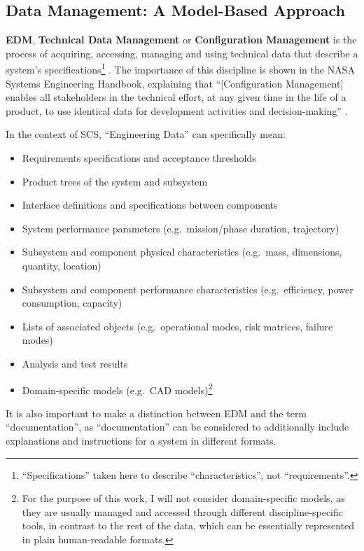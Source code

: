 \documentclass[a4paper,nobib,justified,final]{tufte-book}
\begin{document}
\FloatBarrier
\subsection{Data Management: A Model-Based Approach}
\label{sec:METHODOLOGY_datamanagement}

\textbf{\ac{EDM}}, \textbf{Technical Data Management} or \textbf{Configuration Management}
is the process of acquiring, accessing, managing and using technical data that describe a system's specifications\footnote{``Specifications'' taken here to describe ``characteristics'', not ``requirements''.} \autocite{sheaNASASystemsEngineering2020,ECSS-M-ST-40C,ECSS-E-TM-10-25A}. 
The importance of this discipline is shown in the \acs{NASA} Systems Engineering Handbook, explaining that ``[Configuration Management] enables all stakeholders in the technical effort, at any given time in the life of a product, to use identical data for development activities and decision-making'' \cite{sheaNASASystemsEngineering2020}.

In the context of \ac{SCS}, ``Engineering Data'' can specifically mean:
\begin{itemize}[itemsep=-2ex]
	\item Requirements specifications and acceptance thresholds
	\item Product trees of the system and subsystem
	\item Interface definitions and specifications between components
	\item System performance parameters (e.g.~mission/phase duration, trajectory)
	\item Subsystem and component physical characteristics (e.g.~mass, dimensions, quantity, location)
	\item Subsystem and component performance characteristics (e.g.~efficiency, power consumption, capacity)
	\item Lists of associated objects (e.g.~operational modes, risk matrices, failure modes)
	\item Analysis and test results
	\item Domain-specific models (e.g.~\acs{CAD} models)\footnote{For the purpose of this work, I will not consider domain-specific models, as they are usually managed and accessed through different discipline-specific tools, in contrast to the rest of the data, which can be essentially represented in plain human-readable formats.}
\end{itemize}

It is also important to make a distinction between \ac{EDM} and the term ``documentation'', as ``documentation'' can be considered to additionally include explanations and instructions for a system in different formats.
\end{document}
